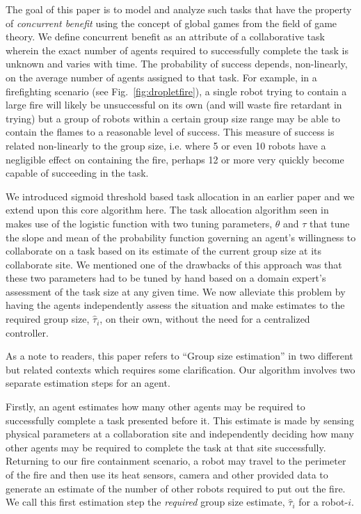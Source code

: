 \documentclass[conference]{ieeeconf}
\def\estt{\hat{\tau}}
\begin{document}
The goal of this paper is to model and analyze such tasks that have the property of \emph{concurrent benefit} using the concept of global games from the field of game theory. We define concurrent benefit as an attribute of a collaborative task wherein the exact number of agents required to successfully complete the task is unknown and varies with time. The probability of success depends, non-linearly, on the average number of agents assigned to that task. For example, in a firefighting scenario (see Fig.~\ref{fig:dropletfire}), a single robot trying to contain a large fire will likely be unsuccessful on its own (and will waste fire retardant in trying) but a group of robots within a certain group size range may be able to contain the flames to a reasonable level of success. This measure of success is related non-linearly to the group size, i.e. where 5 or even 10 robots have a negligible effect on containing the fire, perhaps 12 or more very quickly become capable of succeeding in the task.

We introduced sigmoid threshold based task allocation in an earlier paper \cite{Kanakia2014} and we extend upon this core algorithm here. The task allocation algorithm seen in \cite{Kanakia2014} makes use of the logistic function with two tuning parameters, $\theta$ and $\tau$ that tune the slope and mean of the probability function governing an agent's willingness to collaborate on a task based on its estimate of the current group size at its collaborate site. We mentioned one of the drawbacks of this approach was that these two parameters had to be tuned by hand based on a domain expert's assessment of the task size at any given time. We now alleviate this problem by having the agents independently assess the situation and make estimates to the required group size, $\estt_i$, on their own, without the need for a centralized controller.

As a note to readers, this paper refers to ``Group size estimation'' in two different but related contexts which requires some clarification. Our algorithm involves two separate estimation steps for an agent. 

Firstly, an agent estimates how many other agents may be required to successfully complete a task presented before it. This estimate is made by sensing physical parameters at a collaboration site and independently deciding how many other agents may be required to complete the task at that site successfully. Returning to our fire containment scenario, a robot may travel to the perimeter of the fire and then use its heat sensors, camera and other provided data to generate an estimate of the number of other robots required to put out the fire. We call this first estimation step the \emph{required} group size estimate, $\estt_i$ for a robot-$i$.
\end{document}
